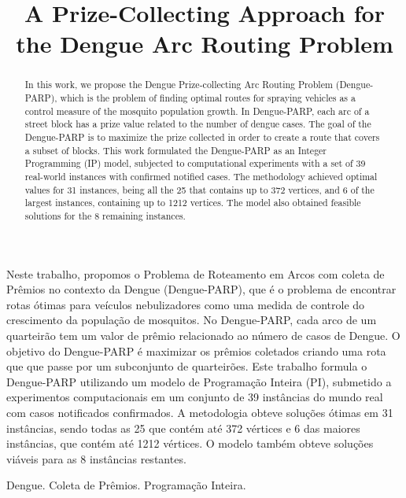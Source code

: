 \documentclass[a4paper,11pt]{article}
\begin{document}
\title{A Prize-Collecting Approach for the Dengue Arc Routing Problem} 

\maketitle
\thispagestyle{fancy}

\author{
}

\author{ 
}

\vspace{8mm}
\begin{resumo} 

Neste trabalho, propomos o Problema de Roteamento em Arcos com coleta de Prêmios
no contexto da Dengue (Dengue-PARP), que  é o problema de encontrar rotas ótimas
para  veículos nebulizadores  como  uma  medida de  controle  do crescimento  da
população de mosquitos. No Dengue-PARP, cada  arco de um quarteirão tem um valor
de prêmio relacionado ao número de casos  de Dengue. O objetivo do Dengue-PARP é
maximizar os prêmios coletados criando uma rota que que passe por um subconjunto
de  quarteirões. Este  trabalho formula  o Dengue-PARP  utilizando um  modelo de
Programação Inteira (PI), submetido a experimentos computacionais em um conjunto
de 39 instâncias do mundo real  com casos notificados confirmados. A metodologia
obteve soluções ótimas  em 31 instâncias, sendo  todas as 25 que  contém até 372
vértices e  6 das  maiores instâncias,  que contém até  1212 vértices.  O modelo
também obteve soluções viáveis para as 8 instâncias restantes.

\end{resumo}

\bigskip
\begin{palchaves}
Dengue. Coleta de Prêmios. Programação Inteira.
\end{palchaves}


\vspace{8mm}

\begin{abstract}

In  this  work, we  propose  the  Dengue  Prize-collecting Arc  Routing  Problem
(Dengue-PARP),  which is  the problem  of  finding optimal  routes for  spraying
vehicles as a control measure of the mosquito population growth. In Dengue-PARP,
each arc  of a street block  has a prize value  related to the number  of dengue
cases. The goal of  the Dengue-PARP is to maximize the  prize collected in order
to create  a route  that covers  a subset  of blocks.  This work  formulated the
Dengue-PARP as  an Integer  Programming (IP)  model, subjected  to computational
experiments with a set of 39 real-world instances with confirmed notified cases.
The methodology achieved optimal values for  31 instances, being all the 25 that
contains up to  372 vertices, and 6  of the largest instances,  containing up to
1212 vertices.  The model also obtained  feasible solutions for the  8 remaining
instances.

\end{abstract}
\end{document}

